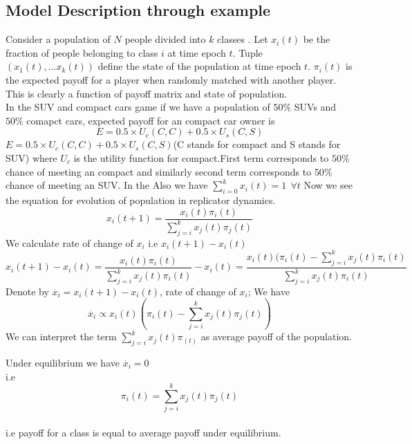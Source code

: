 \documentclass[letterpaper,english,10pt]{article}
\begin{document}
\subsection{Model Description through example}
Consider a population of $N$ people divided into $k$ classes . Let $x_i(t)$ be the fraction of people belonging to class $i$ at time epoch $t$.  Tuple $(x_1(t),\dots x_k(t))$ define the state of the population at time epoch $t$. $\pi_i(t)$ is the expected payoff for a player when randomly matched with another player. This is clearly a function of payoff matrix and state of population. \\
In the SUV and compact cars game if we have a population of $50\%$ SUVs and $50\%$ comapct cars, expected payoff for an compact car owner is \\
\begin{equation}
E=0.5\times U_c(C,C) + 0.5 \times U_s(C,S)
\end{equation}
$E=0.5\times U_c(C,C) + 0.5 \times U_s(C,S)$(C stands for compact and S stands for SUV) where $U_c$ is the utility function for compact.First term corresponds to $50\%$ chance of meeting an compact and similarly second term corresponds to $50\%$ chance of meeting an SUV. In the
Also we have $\sum_{i=0}^{k}x_i(t) = 1 ~~ \forall t$
Now we see the equation for evolution of population in replicator dynamics.
\begin{equation}
    x_i(t+1) = \frac{x_i(t)\pi_i(t)}{\sum_{j=i}^{k}x_j(t)\pi_j(t)}
\end{equation}
We calculate rate of change of $x_i$ i.e $x_i(t+1)-x_i(t)$  
\begin{equation}
    x_i(t+1) - x_i(t) =  \frac{x_i(t)\pi_i(t)}{\sum_{j=i}^{k}x_j(t)\pi_i(t)} -x_i(t)
    = \frac{x_i(t)(\pi_i(t)-\sum_{j=i}^{k}x_j(t)\pi_i(t)}{\sum_{j=i}^{k}x_j(t)\pi_i(t)}
\end{equation}
Denote by $\overset{.}x_i = x_i(t+1) - x_i(t)$, rate of change of $x_i$; 
We have
\begin{equation}
\overset{.}x_i \propto x_i(t)(\pi_i(t)-\sum_{j=i}^{k}x_j(t)\pi_j(t)) 
\end{equation}
We can interpret the term $\sum_{j=i}^{k}x_j(t)\pi_(t)$ as average payoff of the population. 

Under equilibrium we have $\overset{.}x_i =0 $  \\
 i.e 
 \begin{equation}\label{rdeqm}
    \pi_i(t)=\sum_{j=i}^{k}x_j(t)\pi_j(t)
 \end{equation} \\
 i.e payoff for a class is equal to average payoff under equilibrium.
 
\end{document}
